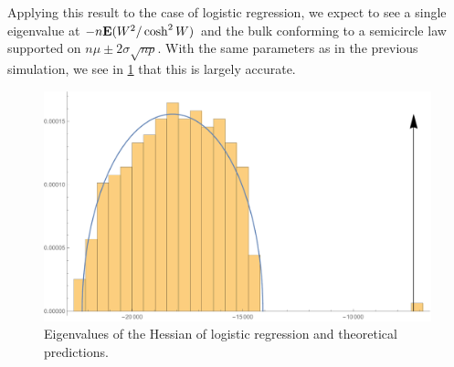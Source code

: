 \documentclass{hw-scrartcl}
\begin{document}
Applying this result to the case of logistic regression, we expect to see a single eigenvalue at \(-n\mathbf{E}(W^2/\cosh^2 W)\) and the bulk conforming to a semicircle law supported on \(n\mu \pm 2\sigma \sqrt{np}\). With the same parameters as in the previous simulation, we see in \cref{fig:logistic-semicircle} that this is largely accurate.
\begin{figure}
  \centering
  \includegraphics[width=\linewidth]{figures/logistic-eigenvalues}
  \caption{Eigenvalues of the Hessian of logistic regression and theoretical predictions.}
  \label{fig:logistic-semicircle}
\end{figure}
\end{document}
